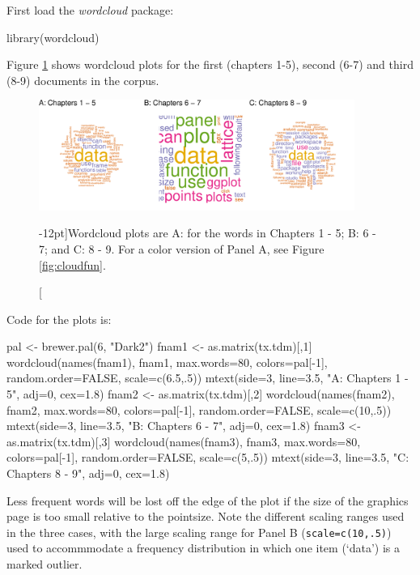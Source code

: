 \documentclass{tufte-book}\usepackage[]{graphicx}\usepackage[]{color}
\newcommand{\txtt}[1]{\texttt{#1}}
\begin{document}
First load the {\em wordcloud} package:
\begin{Schunk}
\begin{Sinput}
library(wordcloud)
\end{Sinput}
\end{Schunk}

Figure \ref{fig:wc} shows wordcloud plots for the first (chapters 1-5),
second (6-7) and third (8-9) documents in the corpus.
\vspace*{15pt}

\begin{figure}
\begin{Schunk}


\centerline{\includegraphics[width=0.92\textwidth]{figs/14-wordcloud1-3-1} }

\end{Schunk}
\caption[][-12pt]{Wordcloud plots are A: for the words in Chapters 1 - 5; B: 6 -
  7; and C: 8 - 9. For a color version of Panel A, see Figure 
  \ref{fig:cloudfun}.\label{fig:wc}}
\end{figure}

\vspace*{-9pt}

\noindent
Code for the plots is:
\begin{fullwidth}
\begin{Schunk}
\begin{Sinput}
pal <- brewer.pal(6, "Dark2")
fnam1 <- as.matrix(tx.tdm)[,1]
wordcloud(names(fnam1), fnam1, max.words=80, colors=pal[-1],
          random.order=FALSE, scale=c(6.5,.5))
mtext(side=3, line=3.5, "A: Chapters 1 - 5", adj=0, cex=1.8)
fnam2 <- as.matrix(tx.tdm)[,2]
wordcloud(names(fnam2), fnam2, max.words=80, colors=pal[-1],
          random.order=FALSE, scale=c(10,.5))
mtext(side=3, line=3.5, "B: Chapters 6 - 7", adj=0, cex=1.8)
fnam3 <- as.matrix(tx.tdm)[,3]
wordcloud(names(fnam3), fnam3, max.words=80, colors=pal[-1],
          random.order=FALSE, scale=c(5,.5))
mtext(side=3, line=3.5, "C: Chapters 8 - 9", adj=0, cex=1.8)
\end{Sinput}
\end{Schunk}
\end{fullwidth}
 Less frequent words will be lost off the
edge of the plot if the size of the graphics page is too small
relative to the pointsize.  Note the different scaling ranges used in
the three cases, with the large scaling range for Panel B
(\txtt{scale=c(10,.5)}) used to accommmodate a frequency distribution
in which one item (`data') is a marked outlier.
\end{document}
